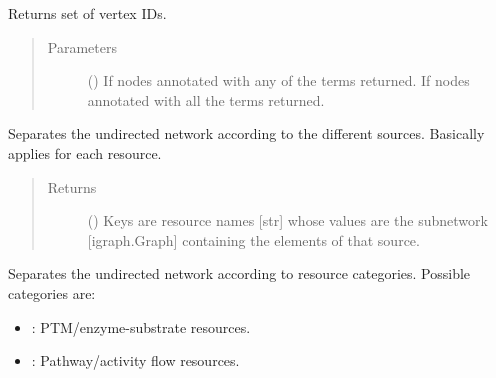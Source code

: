 \documentclass[letterpaper,10pt,english]{sphinxmanual}
\begin{document}
\begin{fulllineitems}
\begin{fulllineitems}
Returns set of vertex IDs.
\begin{quote}\begin{description}
\item[{Parameters}] \leavevmode
{} () \textendash{} If  nodes annotated with any of the terms returned.
If  nodes annotated with all the terms returned.

\end{description}\end{quote}

\end{fulllineitems}


\begin{fulllineitems}
\label{\detokenize{main:pypath.main.PyPath.separate}}
Separates the undirected network according to the different
sources. Basically applies
{\hyperref[\detokenize{main:pypath.main.PyPath.get_network}]{}} for each resource.
\begin{quote}\begin{description}
\item[{Returns}] \leavevmode
() \textendash{} Keys are resource names {[}str{]} whose values are
the subnetwork {[}igraph.Graph{]} containing the elements of
that source.

\end{description}\end{quote}

\end{fulllineitems}


\begin{fulllineitems}
\label{\detokenize{main:pypath.main.PyPath.separate_by_category}}
Separates the undirected network according to resource
categories. Possible categories are:
\begin{itemize}
\item {} 
: PTM/enzyme-substrate resources.

\item {} 
: Pathway/activity flow resources.


\end{itemize}
\end{fulllineitems}
\end{fulllineitems}
\end{document}
